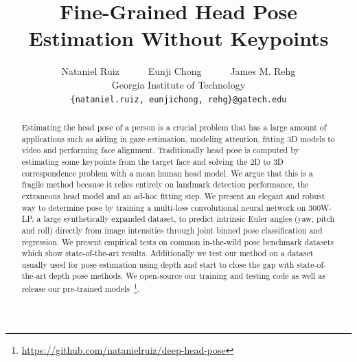 \documentclass[10pt,twocolumn,letterpaper]{article}
\begin{document}
\title{Fine-Grained Head Pose Estimation Without Keypoints}

\author{Nataniel Ruiz~~~~~~Eunji Chong~~~~~~James M. Rehg\\
Georgia Institute of Technology\\
{\tt\small \{nataniel.ruiz, eunjichong, rehg\}@gatech.edu}
}

\maketitle

\begin{abstract}

Estimating the head pose of a person is a crucial problem that has a large amount of applications such as aiding in gaze estimation, modeling attention, fitting 3D models to video and performing face alignment. Traditionally head pose is computed by estimating some keypoints from the target face and solving the 2D to 3D correspondence problem with a mean human head model. We argue that this is a fragile method because it relies entirely on landmark detection performance, the extraneous head model and an ad-hoc fitting step. We present an elegant and robust way to determine pose by training a multi-loss convolutional neural network on 300W-LP, a large synthetically expanded dataset, to predict intrinsic Euler angles (yaw, pitch and roll) directly from image intensities through joint binned pose classification and regression. We present empirical tests on common in-the-wild pose benchmark datasets which show state-of-the-art results. Additionally we test our method on a dataset usually used for pose estimation using depth and start to close the gap with state-of-the-art depth pose methods. We open-source our training and testing code as well as release our pre-trained models~\footnote{\url{https://github.com/natanielruiz/deep-head-pose}}.

\end{abstract}


\end{document}
